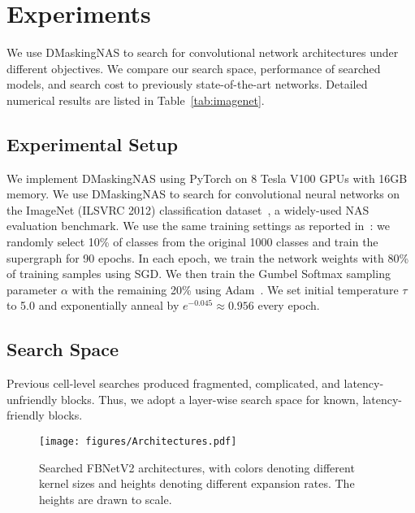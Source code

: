 \documentclass[10pt,twocolumn,letterpaper]{article}
\begin{document}
\section{Experiments}

We use DMaskingNAS to search for convolutional network architectures under different objectives.  We compare our search space, performance of searched models, and search cost to previously state-of-the-art networks. Detailed numerical results are listed in Table~\ref{tab:imagenet}.

\subsection{Experimental Setup}
We implement DMaskingNAS using PyTorch on 8 Tesla V100 GPUs with 16GB memory. We use DMaskingNAS to search for convolutional neural networks on the ImageNet (ILSVRC 2012) classification dataset~\cite{imagenet}, a widely-used NAS evaluation benchmark. We use the same training settings as reported in~\cite{fbnet}: we randomly select 10\% of classes from the original 1000 classes and train the supergraph for 90 epochs. In each epoch, we train the network weights with 80\% of training samples using SGD. We then train the Gumbel Softmax sampling parameter $\alpha$ with the remaining 20\% using Adam~\cite{kingma2014adam}. We set initial temperature $\tau$ to 5.0 and exponentially anneal by $e^{-0.045}\approx 0.956$ every epoch.

\subsection{Search Space}
Previous cell-level searches produced fragmented, complicated, and latency-unfriendly blocks. Thus, we adopt a layer-wise search space for known, latency-friendly blocks. 

\begin{figure}
    \centering
    \texttt{[image: figures/Architectures.pdf]}
    \caption{Searched FBNetV2 architectures, with colors denoting different kernel sizes and heights denoting different expansion rates. The heights are drawn to scale.}
    \label{fig:architectures}
\end{figure}
\end{document}
